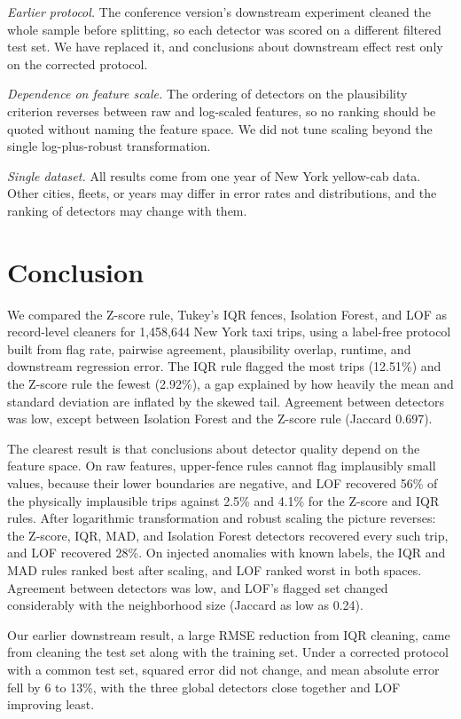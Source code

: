 \documentclass{ieeeaccess}
\begin{document}
\emph{Earlier protocol.} The conference version's downstream experiment cleaned the whole sample before splitting, so each detector was scored on a different filtered test set. We have replaced it, and conclusions about downstream effect rest only on the corrected protocol.

\emph{Dependence on feature scale.} The ordering of detectors on the plausibility criterion reverses between raw and log-scaled features, so no ranking should be quoted without naming the feature space. We did not tune scaling beyond the single log-plus-robust transformation.

\emph{Single dataset.} All results come from one year of New York yellow-cab data. Other cities, fleets, or years may differ in error rates and distributions, and the ranking of detectors may change with them.

\section{Conclusion}
\label{sec:conclusion}
We compared the Z-score rule, Tukey's IQR fences, Isolation Forest, and LOF as record-level cleaners for 1,458,644 New York taxi trips, using a label-free protocol built from flag rate, pairwise agreement, plausibility overlap, runtime, and downstream regression error. The IQR rule flagged the most trips (12.51\%) and the Z-score rule the fewest (2.92\%), a gap explained by how heavily the mean and standard deviation are inflated by the skewed tail. Agreement between detectors was low, except between Isolation Forest and the Z-score rule (Jaccard 0.697).

The clearest result is that conclusions about detector quality depend on the feature space. On raw features, upper-fence rules cannot flag implausibly small values, because their lower boundaries are negative, and LOF recovered 56\% of the physically implausible trips against 2.5\% and 4.1\% for the Z-score and IQR rules. After logarithmic transformation and robust scaling the picture reverses: the Z-score, IQR, MAD, and Isolation Forest detectors recovered every such trip, and LOF recovered 28\%. On injected anomalies with known labels, the IQR and MAD rules ranked best after scaling, and LOF ranked worst in both spaces. Agreement between detectors was low, and LOF's flagged set changed considerably with the neighborhood size (Jaccard as low as 0.24).

Our earlier downstream result, a large RMSE reduction from IQR cleaning, came from cleaning the test set along with the training set. Under a corrected protocol with a common test set, squared error did not change, and mean absolute error fell by 6 to 13\%, with the three global detectors close together and LOF improving least.
\end{document}
